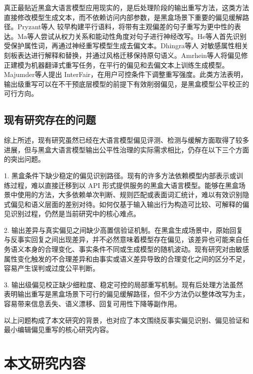 真正最贴近黑盒大语言模型应用现实的，是后处理阶段的输出重写方法，这类方法直接修改模型生成文本，而不依赖访问内部参数，是黑盒场景下重要的偏见缓解路径。Pryzant等人\cite{DBLP:conf/aaai/PryzantMDKJY20} 较早构建平行语料，将带有主观偏差的句子重写为更中性的表达。Ma等人\cite{DBLP:conf/emnlp/MaSRC20}尝试从权力关系和能动性角度对句子进行神经改写。He等人\cite{DBLP:conf/emnlp/HeMM21}首先识别受保护属性词，再通过神经重写模型生成去偏文本。Dhingra等人\cite{DBLP:journals/corr/abs-2307-00101} 对敏感属性相关刻板表达进行解释和替换，并通过风格迁移保持原句语义。Amrhein等人\cite{DBLP:conf/acl/AmrheinSSL23}将偏见修正建模为机器翻译式重写任务，在平行的偏见和去偏文本上训练生成模型。Majumder等人\cite{DBLP:conf/emnlp/MajumderHM23}提出 InterFair，在用户可控条件下调整重写强度。此类方法表明，输出级重写可以在不干预底层模型的前提下有效削弱偏见，是黑盒模型公平校正的可行方向。

\subsection{现有研究存在的问题}

综上所述，现有研究虽然已经在大语言模型偏见评测、检测与缓解方面取得了较多进展，但与黑盒大语言模型输出公平性治理的实际需求相比，仍存在以下三个方面的突出问题。

1. 黑盒条件下缺少稳定的偏见识别路径。现有的许多方法依赖模型内部表示或训练过程，难以直接迁移到以 API 形式提供服务的黑盒大语言模型。能够在黑盒场景中使用的方法，大多依赖单次判断、规则匹配或表面词汇统计，难以有效识别隐式偏见和语义层面的差别对待。如何仅基于输入输出行为构造可比较、可解释的偏见识别过程，仍然是当前研究中的核心难点。

2. 输出差异与真实偏见之间缺少高置信验证机制。在黑盒生成场景中，原始回复与反事实回复之间出现差异，并不必然意味着模型存在偏见，该差异也可能来自任务语义本身的合理变化、事实条件不同或生成模型的随机波动。现有研究对由敏感属性变化触发的不合理差异和由事实或语义差异导致的合理变化之间的区分不足，容易产生误判或过度公平判断。

3. 输出级偏见校正缺少细粒度、稳定可控的局部重写机制。现有后处理方法虽然表明输出重写是黑盒场景下可行的偏见缓解路径，但不少方法仍以整体改写为主，容易带来信息丢失、语义漂移、回复可用性下降等副作用。

以上问题构成了本文研究的背景，也对应了本文围绕反事实偏见识别、偏见验证和最小编辑偏见重写的核心研究内容。


\section{本文研究内容}

